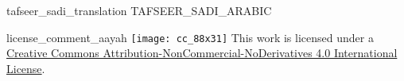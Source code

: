 \begin{taggedblock}{tafseer_sadi_translation}
TAFSEER_SADI_ARABIC
\end{taggedblock}
\begin{taggedblock}{license_comment_aayah}
\texttt{[image: cc\_88x31]}
This work is licensed under a 
\href{http://creativecommons.org/licenses/by-nc-nd/4.0/}{Creative Commons Attribution-NonCommercial-NoDerivatives 4.0 International License}.
\end{taggedblock}
\begin{comment}
Please use the following for footnotes:- Sample\footnoteQ{Text of Qur'an footnote goes here.}.
Sample\footnoteT{Text of Tafseer footnote goes here.}.
\end{comment}